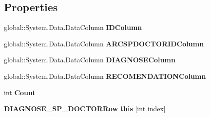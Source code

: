 \subsection*{Properties}
\begin{CompactItemize}
\item 
global::System.Data.DataColumn \textbf{IDColumn}\hspace{0.3cm}{\tt  [get]}\label{class_automatic_medical_system_1_1_data_set1_1_1_d_i_a_g_n_o_s_e___s_p___d_o_c_t_o_r_data_table_e5cec84ce85bfe98daa75634139ad1d2}

\item 
global::System.Data.DataColumn \textbf{ARCSPDOCTORIDColumn}\hspace{0.3cm}{\tt  [get]}\label{class_automatic_medical_system_1_1_data_set1_1_1_d_i_a_g_n_o_s_e___s_p___d_o_c_t_o_r_data_table_c29c2f542d8ed1cb5d8db03995343214}

\item 
global::System.Data.DataColumn \textbf{DIAGNOSEColumn}\hspace{0.3cm}{\tt  [get]}\label{class_automatic_medical_system_1_1_data_set1_1_1_d_i_a_g_n_o_s_e___s_p___d_o_c_t_o_r_data_table_35399f8009624cfa5e88c14a87a925b7}

\item 
global::System.Data.DataColumn \textbf{RECOMENDATIONColumn}\hspace{0.3cm}{\tt  [get]}\label{class_automatic_medical_system_1_1_data_set1_1_1_d_i_a_g_n_o_s_e___s_p___d_o_c_t_o_r_data_table_3bbf9fe968111ff91ae9f0233664e8ee}

\item 
int \textbf{Count}\hspace{0.3cm}{\tt  [get]}\label{class_automatic_medical_system_1_1_data_set1_1_1_d_i_a_g_n_o_s_e___s_p___d_o_c_t_o_r_data_table_91956efd2b58c06ce36ea0640a3bf1c6}

\item 
{\bf DIAGNOSE\_\-SP\_\-DOCTORRow} \textbf{this} [int index]\hspace{0.3cm}{\tt  [get]}\label{class_automatic_medical_system_1_1_data_set1_1_1_d_i_a_g_n_o_s_e___s_p___d_o_c_t_o_r_data_table_3db13f8d85fd0c5b55829594458f7ba9}

\end{CompactItemize}
